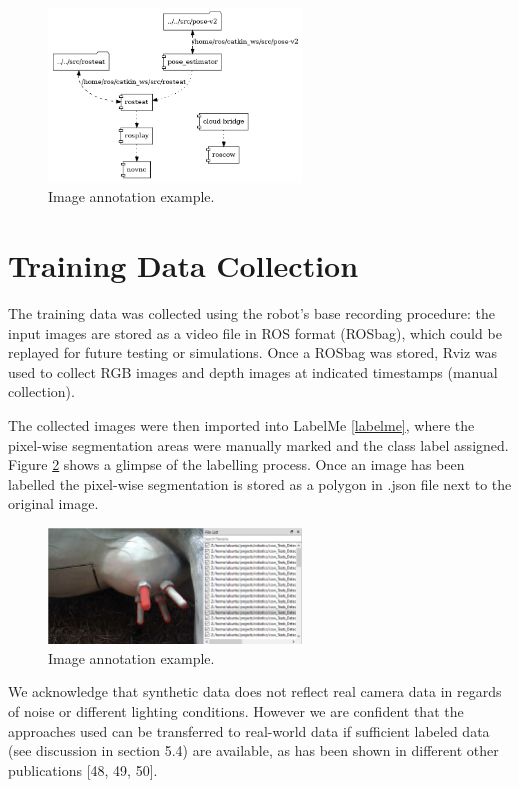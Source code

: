 \begin{figure}[h]
    \centering
    \includegraphics[width=0.6\textwidth]{images/cow_docker_topology.png}
    \caption{Image annotation example.}
    \label{fig:cow_docker_topology}
\end{figure}


\section{Training Data Collection}
The training data was collected using the robot's base recording procedure: the input images are stored as a video file in ROS format (ROSbag), which could be replayed for future testing or simulations. Once a ROSbag was stored, Rviz was used to collect RGB images and depth images at indicated timestamps (manual collection).

The collected images were then imported into LabelMe 
\ref{labelme}, where the pixel-wise segmentation areas were manually marked and the class label assigned. Figure \ref{fig:cow_labelme} shows a glimpse of the labelling process. Once an image has been labelled the pixel-wise segmentation is stored as a polygon in .json file next to the original image.

\begin{figure}[h]
    \centering
    \includegraphics[width=0.6\textwidth]{images/cow_labelme.png}
    \caption{Image annotation example.}
    \label{fig:cow_labelme}
\end{figure}
    
We acknowledge that synthetic data does not reﬂect real camera data in regards of noise or diﬀerent
lighting conditions. However we are conﬁdent that the approaches used can be transferred to real-world
data if suﬃcient labeled data (see discussion in section 5.4) are available, as has been shown in diﬀerent
other publications [48, 49, 50].

